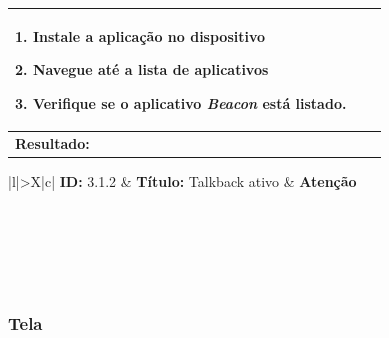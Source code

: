 \documentclass[
	12pt,				%
	oneside,			%
	a4paper,			%
	brazil				%
]{abntex2}
\begin{document}
\begin{apendicesenv}
\begin{table}[H]
\begin{tabularx}{\textwidth}{|l|>{\hsize=2\hsize}X|c|}
{1. Instale a aplicação no dispositivo

2. Navegue até a lista de aplicativos

3. Verifique se o aplicativo \textit{Beacon} está listado.
} \\ 
\hline 
\multicolumn{3}{|X|}{\textbf{Resultado:}} \\ 
\hline 
\end{tabularx} 
\end{table}
\egroup

\bgroup
\def\arraystretch{1.5}
\begin{table}[H]

\begin{tabularx}{\textwidth}{|l|>{\hsize}X|c|}
\hline 
\textbf{ID:} 3.1.2 & \textbf{Título:} Talkback ativo & \textbf{Atenção} \\ 
\hline 
{} \\ 
\hline  
{} \\ 
\hline 
{} \\ 
\hline 
{} \\ 
\hline 
{} \\ 
\hline 
\end{tabularx} 
\end{table}
\egroup

\subsubsection*{Tela}

\bgroup
\def\arraystretch{1.5}
\begin{table}[H]


\end{table}
\end{apendicesenv}
\end{document}
